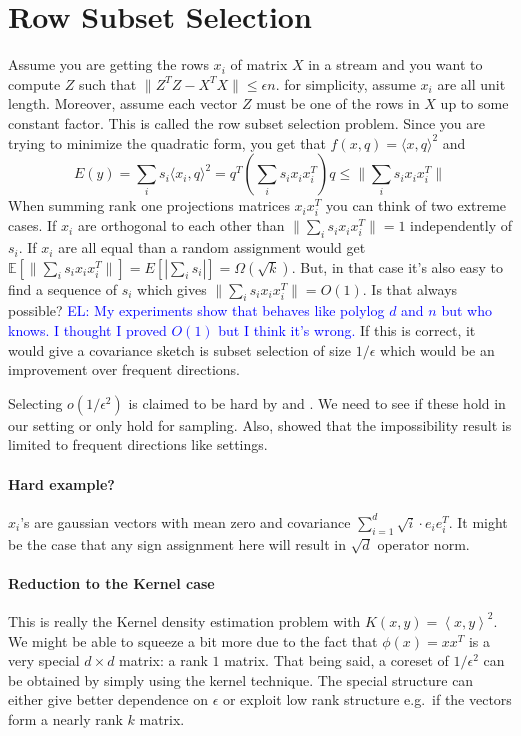 \documentclass{article} %
\newcommand{\el}[1]{\textcolor{blue}{EL: #1}}
\newcommand{\ip}[1]{\left \langle #1 \right \rangle}
\newcommand{\E}{\mathbb{E}}
\newcommand{\eps}{\epsilon}
\begin{document}
\section{Row Subset Selection}
Assume you are getting the rows $x_i$  of matrix $X$ in a stream and you want to compute $Z$ such that $\|Z^TZ - X^TX\| \le \eps n$.
for simplicity, assume $x_i$ are all unit length. Moreover, assume each vector $Z$ must be one of the rows in $X$ up to some constant factor.
This is called the row subset selection problem. 
Since you are trying to minimize the quadratic form, you get that $f(x, q) = \langle x,q \rangle ^2$ and 
$$E(y) = \sum_i s_i \langle x_i,q \rangle ^2 = q^T (\sum_i s_i x_i x_i^T ) q \le \|\sum_i s_i x_i x_i^T\|$$
When summing rank one projections matrices $x_i x_i^T$ you can think of two extreme cases. 
If $x_i$ are orthogonal to each other than $\|\sum_i s_i x_i x_i^T\| = 1$ independently of $s_i$.
If $x_i$ are all equal than a random assignment would get  $\E[\|\sum_i s_i x_i x_i^T\|] = E[|\sum_i s_i|] = \Omega(\sqrt{k})$.
But, in that case it's also easy to find a sequence of $s_i$ which gives $\|\sum_i s_i x_i x_i^T\| = O(1)$. Is that always possible?
\el{My experiments show that behaves like polylog $d$ and $n$ but who knows. I thought I proved $O(1)$ but I think it's wrong.}
If this is correct, it would give a covariance sketch is subset selection of size $1/\eps$ which would be an improvement over frequent directions.

Selecting $o(1/\eps^2)$ is claimed to be hard by \cite{DBLP:conf/focs/DeshpandeR10} and \cite{DBLP:conf/soda/DeshpandeRVW06}. We need to see if these hold in our setting or only hold for sampling.  Also, \cite{DBLP:conf/soda/GhashamiP14} showed that the impossibility result is limited to frequent directions like settings.

\paragraph{Hard example?}
$x_i$'s are gaussian vectors with mean zero and covariance $\sum_{i=1}^d \sqrt{i} \cdot e_i e_i^T$. It might be the case that any sign assignment here will result in $\sqrt{d}$ operator norm. 

\paragraph{Reduction to the Kernel case}
This is really the Kernel density estimation problem with $K(x,y) = \ip{x,y}^2$. We might be able to squeeze a bit more due to the fact that $\phi(x) = xx^T$ is a very special $d \times d$ matrix: a rank $1$ matrix. That being said, a coreset of $1/\eps^2$ can be obtained by simply using the kernel technique. The special structure can either give better dependence on $\eps$ or exploit low rank structure e.g.\ if the vectors form a nearly rank $k$ matrix.
\end{document}
